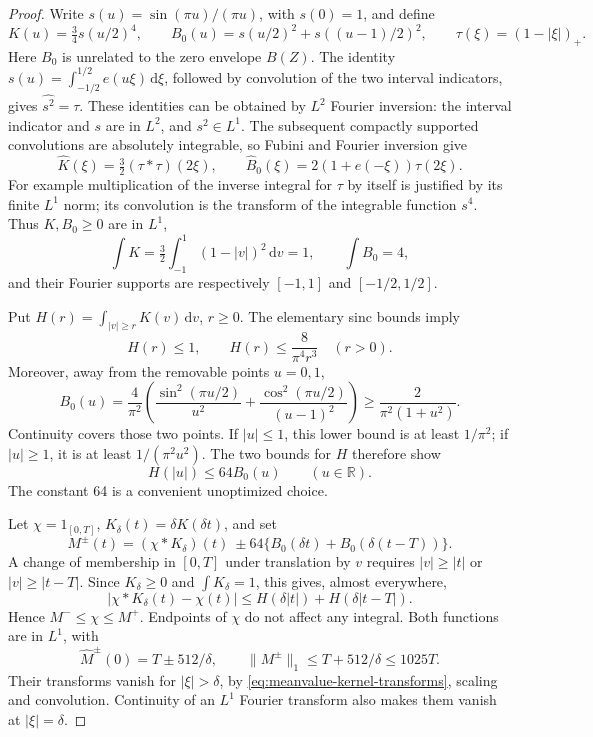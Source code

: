 \documentclass[11pt]{article}
\newcommand{\dd}{\,\mathrm d}
\begin{document}
\begin{proof}
Write \(s(u)=\sin(\pi u)/(\pi u)\), with \(s(0)=1\), and define
\[
 K(u)=\tfrac34s(u/2)^4,\qquad
 B_0(u)=s(u/2)^2+s((u-1)/2)^2,\qquad
 \tau(\xi)=(1-|\xi|)_+.
\]
Here \(B_0\) is unrelated to the zero envelope \(B(Z)\).
The identity \(s(u)=\int_{-1/2}^{1/2}e(u\xi)\dd\xi\), followed by
convolution of the two interval indicators, gives
\(\widehat{s^2}=\tau\). These identities can be obtained by
\(L^2\) Fourier inversion: the interval indicator and \(s\) are in
\(L^2\), and \(s^2\in L^1\). The subsequent compactly supported
convolutions are absolutely integrable, so Fubini and Fourier inversion
give
\begin{equation}\label{eq:meanvalue-kernel-transforms}
 \widehat K(\xi)=\tfrac32(\tau*\tau)(2\xi),\qquad
 \widehat B_0(\xi)=2(1+e(-\xi))\tau(2\xi).
\end{equation}
For example multiplication of the inverse integral for \(\tau\)
by itself is justified by its finite \(L^1\) norm; its convolution
is the transform of the integrable function \(s^4\).
Thus \(K,B_0\geq0\) are in \(L^1\),
\[
 \int K=\tfrac32\int_{-1}^1(1-|v|)^2\dd v=1,\qquad
 \int B_0=4,
\]
and their Fourier supports are respectively \([-1,1]\) and
\([-1/2,1/2]\).

Put \(H(r)=\int_{|v|\geq r}K(v)\dd v\), \(r\geq0\).
The elementary sinc bounds imply
\[
 H(r)\leq1,\qquad H(r)\leq\frac8{\pi^4r^3}\quad(r>0).
\]
Moreover, away from the removable points \(u=0,1\),
\[
 B_0(u)=\frac4{\pi^2}
 \left(\frac{\sin^2(\pi u/2)}{u^2}
       +\frac{\cos^2(\pi u/2)}{(u-1)^2}\right)
 \geq\frac2{\pi^2(1+u^2)}.
\]
Continuity covers those two points. If \(|u|\leq1\), this lower bound
is at least \(1/\pi^2\); if \(|u|\geq1\), it is at least
\(1/(\pi^2u^2)\). The two bounds for \(H\) therefore show
\begin{equation}\label{eq:meanvalue-tail-majorant}
 H(|u|)\leq64B_0(u)\qquad(u\in\mathbb R).
\end{equation}
The constant 64 is a convenient unoptimized choice.

Let \(\chi=1_{[0,T]}\), \(K_\delta(t)=\delta K(\delta t)\), and set
\[
 M^\pm(t)=(\chi*K_\delta)(t)
 \ \pm64\{B_0(\delta t)+B_0(\delta(t-T))\}.
\]
A change of membership in \([0,T]\) under translation by \(v\)
requires \(|v|\geq|t|\) or \(|v|\geq|t-T|\). Since \(K_\delta\geq0\)
and \(\int K_\delta=1\), this gives, almost everywhere,
\[
 |\chi*K_\delta(t)-\chi(t)|
 \leq H(\delta|t|)+H(\delta|t-T|).
\]
Hence \(M^-\leq\chi\leq M^+\). Endpoints of \(\chi\) do not affect
any integral. Both functions are in \(L^1\), with
\[
 \widehat M^\pm(0)=T\pm512/\delta,\qquad
 \|M^\pm\|_1\leq T+512/\delta\leq1025T.
\]
Their transforms vanish for \(|\xi|>\delta\), by
\eqref{eq:meanvalue-kernel-transforms}, scaling and convolution.
Continuity of an \(L^1\) Fourier transform also makes them vanish
at \(|\xi|=\delta\).


\end{proof}
\end{document}
